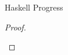 \begin{theorem}{Haskell Progress}
\begin{proof}
\begin{case}{\pshs}
\renewcommand{\x}{\csbrand{\varbrand}{\vartyh}}

\begin{subcase}{\x}


\psred
{\exphs{(\x)}{(\expsh{(\x)}{\varexph})}}
{\varexph}
\psrednote
{\exphs{(\x)}{\first{\varexps}}}
{\expwrongs{\vartyh}{\errbrand}}
{\first{\varexps} \neq \expsh{(\x)}{\varexph}}

\end{subcase}


\renewcommand{\x}{\csfun{\second{\varcsh}}{\third{\varcsh}}}

\begin{subcase}{\x}

\psred
{\exphs{(\x)}{(\expfabsd{\varvars}{\varexps})}}
{\expfabss{\varvarh}{\tyunbrand{\second{\varcsh}}}{\exphs{\third{\varcsh}}{(\expfapp{(\expfabsd{\varvars}{\varexps})}{(\expsh{\second{\varcsh}}{\varvarh})})}}}
\psrednote
{\exphs{(\x)}{\first{\first{\varexps}}}}
{\expwrongs{\tyunbrand{\x}}{\errfun}}
{\first{\varexps} \neq \expfabsd{\varvars}{\varexps}}

\end{subcase}


\renewcommand{\x}{\csfor{\csvarh}{\second{\varcsh}}}

\begin{subcase}{\x}

\psred
{\exphs{(\x)}{\first{\varexps}}}
{\exptabs{\tyvarh}{\exphs{\second{\varcsh}}{\first{\varexps}}}}

\end{subcase}

\pssub
{\first{\varexps}}
{\second{\varexps}}
{\pshs}
{\exphs{\first{\varcsh}}{\second{\varexps}}}
\pserr
{\first{\varexps}}
{\pshs}

\end{case}

\end{proof}

\end{theorem}
